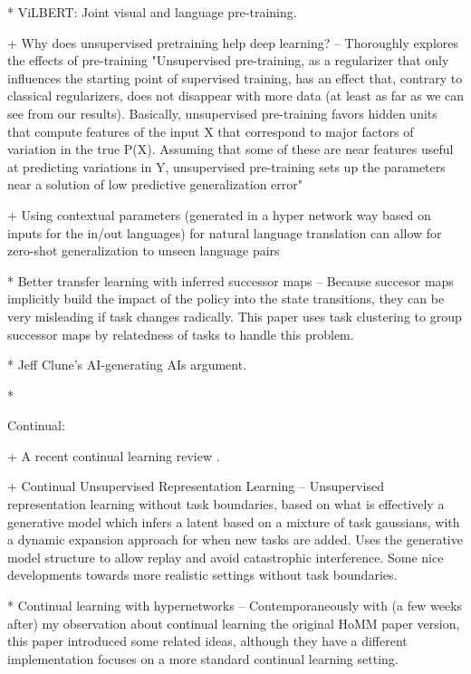 * ViLBERT: Joint visual and language pre-training. \citep{Lu2019}

+ Why does unsupervised pretraining help deep learning? -- Thoroughly explores the effects of pre-training
"Unsupervised pre-training, as a regularizer that only influences the starting point of
supervised training, has an effect that, contrary to classical regularizers, does not disappear with
more data (at least as far as we can see from our results). Basically, unsupervised pre-training favors
hidden units that compute features of the input X that correspond to major factors of variation in
the true P(X). Assuming that some of these are near features useful at predicting variations in Y,
unsupervised pre-training sets up the parameters near a solution of low predictive generalization error" \citep{Erhan2010}

+ Using contextual parameters (generated in a hyper network way based on inputs for the in/out languages) for natural language translation can allow for zero-shot generalization to unseen language pairs \citep{Platanios2017}

* Better transfer learning with inferred successor maps -- Because succesor maps implicitly build the impact of the policy into the state transitions, they can be very misleading if task changes radically. This paper uses task clustering to group successor maps by relatedness of tasks to handle this problem. \citep{Madarasz2019}

* Jeff Clune's AI-generating AIs argument. \citep{Clune2019}

*




Continual:

+ A recent continual learning review \citep{Parisi2019}.

+ Continual Unsupervised Representation Learning -- Unsupervised representation learning without task boundaries, based on what is effectively a generative model which infers a latent based on a mixture of task gaussians, with a dynamic expansion approach for when new tasks are added. Uses the generative model structure to allow replay and avoid catastrophic interference. Some nice developments towards more realistic settings without task boundaries. \citep{Rao2019}

* Continual learning with hypernetworks -- Contemporaneously with (a few weeks after) my observation about continual learning the original HoMM paper version, this paper introduced some related ideas, although they have a different implementation focuses on a more standard continual learning setting. \citep{Oswald2020}

